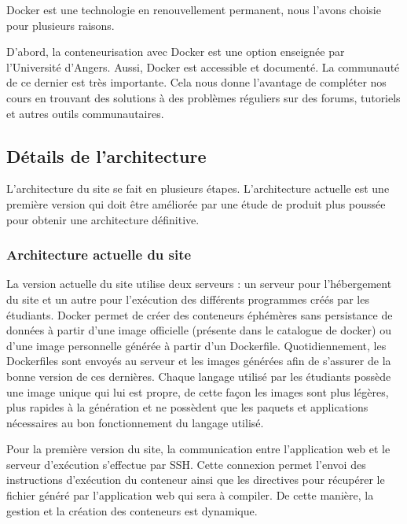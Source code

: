 \par Docker est une technologie en renouvellement permanent, nous l'avons choisie pour plusieurs raisons. \\

\par D'abord, la conteneurisation avec Docker est une option enseignée par l'Université d'Angers. Aussi, Docker est accessible et documenté. La communauté de ce dernier est très importante. Cela nous donne l’avantage de compléter nos cours en trouvant des solutions à des problèmes réguliers sur des forums, tutoriels et autres outils communautaires.


\subsection{Détails de l'architecture}

\par L’architecture du site se fait en plusieurs étapes. L'architecture actuelle est une première version qui doit être améliorée par une étude de produit plus poussée pour obtenir une architecture définitive.

\subsubsection{Architecture actuelle du site}

\par La version actuelle du site utilise deux serveurs : un serveur pour l’hébergement du site et un autre pour l’exécution des différents programmes créés par les étudiants. Docker permet de créer des conteneurs éphémères sans persistance de données à partir d’une image officielle (présente dans le catalogue de docker) ou d’une image personnelle générée à partir d’un Dockerfile. Quotidiennement, les Dockerfiles sont envoyés au serveur et les images générées afin de s’assurer de la bonne version de ces dernières. Chaque langage utilisé par les étudiants possède une image unique qui lui est propre, de cette façon les images sont plus légères, plus rapides à la génération et ne possèdent que les paquets et applications nécessaires au bon fonctionnement du langage utilisé. 

\par Pour la première version du site, la communication entre l’application web et le serveur d'exécution s’effectue par SSH. Cette connexion permet l'envoi des instructions d'exécution du conteneur ainsi que les directives pour récupérer le fichier généré par l’application web qui sera à compiler. De cette manière, la gestion et la création des conteneurs est dynamique.

